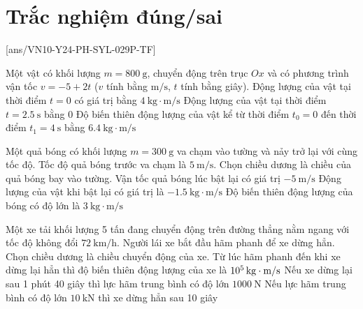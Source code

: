 \section{Trắc nghiệm đúng/sai}
\setcounter{ex}{0}
[ans/VN10-Y24-PH-SYL-029P-TF]
\begin{ex}
	Một vật có khối lượng $m=\SI{800}{\gram}$, chuyển động trên trục $Ox$ và có phương trình vận tốc $v=-5+2t$ ($v$ tính bằng $\si{\meter/\second}$, $t$ tính bằng giây).
	{Động lượng của vật tại thời điểm $t=0$ có giá trị bằng $\SI{4}{\kilogram\cdot\meter/\second}$}
	{\True Động lượng của vật tại thời điểm $t=\SI{2.5}{\second}$ bằng 0}
	{\True Độ biến thiên động lượng của vật kể từ thời điểm $t_0=0$ đến thời điểm $t_1=\SI{4}{\second}$ bằng $\SI{6.4}{\kilogram\cdot\meter/\second}$}
	\loigiai{}
\end{ex}
\begin{ex}
Một quả bóng có khối lượng $m=\SI{300}{\gram}$ va chạm vào tường và nảy trở lại với cùng tốc độ. Tốc độ quả bóng trước va chạm là $\SI{5}{\meter/\second}$. Chọn chiều dương là chiều của quả bóng bay vào tường.
	{\True Vận tốc quả bóng lúc bật lại có giá trị $\SI{-5}{\meter/\second}$}
	{\True Động lượng của vật khi bật lại có giá trị là $\SI{-1.5}{\kilogram\cdot\meter/\second}$}
	{\True Độ biến thiên động lượng của bóng có độ lớn là $\SI{3}{\kilogram\cdot\meter/\second}$}
	\loigiai{}
\end{ex}
\begin{ex}
	Một xe tải khối lượng 5 tấn đang chuyển động trên đường thẳng nằm ngang với tốc độ không đổi $\SI{72}{\kilo\meter/\hour}$. Người lái xe bắt đầu hãm phanh để xe dừng hẳn. Chọn chiều dương là chiều chuyển động của xe.
	{Từ lúc hãm phanh đến khi xe dừng lại hẳn thì độ biến thiên động lượng của xe là $\SI{E5}{\kilogram\cdot\meter/\second}$}
	{\True Nếu xe dừng lại sau 1 phút 40 giây thì lực hãm trung bình có độ lớn $\SI{1000}{\newton}$}
	{\True Nếu lực hãm trung bình có độ lớn $\SI{10}{\kilo\newton}$ thì xe dừng hẳn sau 10 giây}
	\loigiai{}
\end{ex}
